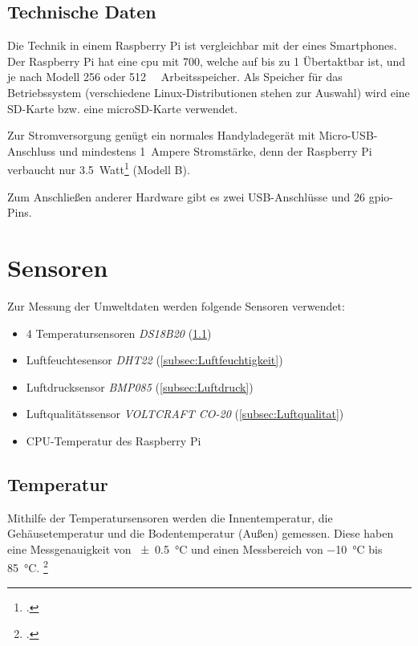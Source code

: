 \subsection{Technische Daten}
\label{subsec:Technische Daten}
Die Technik in einem Raspberry Pi ist vergleichbar mit der eines Smartphones. Der Raspberry Pi hat eine \acrshort{cpu} mit \SI{700}{}, welche auf bis zu \SI{1}{} Übertaktbar ist, und je nach Modell \SI{256}{} oder \SI{512}{\mega\byte} Arbeitsspeicher. Als Speicher für das Betriebssystem (verschiedene Linux-Distributionen stehen zur Auswahl) wird eine SD-Karte bzw. eine microSD-Karte verwendet.

Zur Stromversorgung genügt ein normales Handyladegerät mit Micro-USB-Anschluss und mindestens \SI{1}{\gls{Ampere}} Stromstärke, denn der Raspberry Pi verbaucht nur \SI{3.5}{Watt}\footcite{strom} (Modell B).

Zum Anschließen anderer Hardware gibt es zwei USB-Anschlüsse und 26 \gls{gpio}-Pins.

\section{Sensoren}
\label{sec:Sensoren}

Zur Messung der Umweltdaten werden folgende Sensoren verwendet:
\begin{itemize}
\item 4 Temperatursensoren \textit{DS18B20} (\ref{subsec:Temperatur})
\item Luftfeuchtesensor \textit{DHT22} (\ref{subsec:Luftfeuchtigkeit})
\item Luftdrucksensor \textit{BMP085} (\ref{subsec:Luftdruck})
\item Luftqualitätssensor \textit{VOLTCRAFT CO-20} (\ref{subsec:Luftqualitat})
\item CPU-Temperatur des Raspberry Pi
\end{itemize}
\subsection{Temperatur}
\label{subsec:Temperatur}

Mithilfe der Temperatursensoren werden die Innentemperatur, die Gehäusetemperatur und die Bodentemperatur (Außen) gemessen. Diese haben eine Messgenauigkeit von \SI{\pm 0.5}{\degreeCelsius}  und einen Messbereich von \SI{-10}{\degreeCelsius}  bis \SI{+85}{\degreeCelsius}. \footcite[20]{temp}

